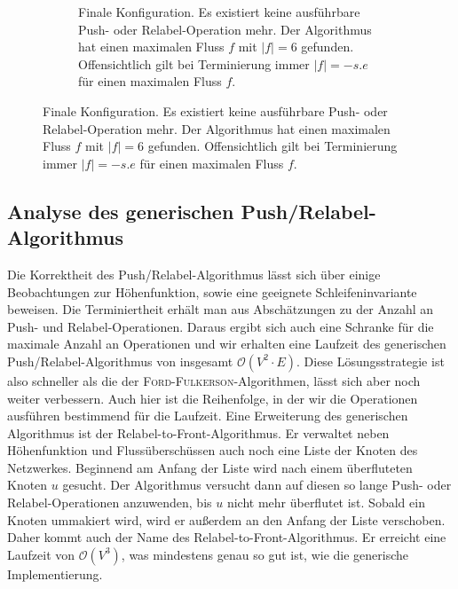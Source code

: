 \documentclass[12pt,a4paper,titlepage,onecolumn,ngerman,bibliography=totocnumbered]{scrartcl}
\theoremstyle{definition}
\theoremstyle{remark}
\newcommand{\ff}{\textsc{Ford-Fulkerson}}
\newcommand{\pr}{Push/Relabel}
\begin{document}
\begin{figure}[H]
\begin{subfigure}{0.95\textwidth}
        \caption{Finale Konfiguration. 
                Es existiert keine ausführbare Push- oder Relabel-Operation mehr. 
                Der Algorithmus hat einen maximalen Fluss $f$ mit $\lvert f\rvert = 6$ gefunden.
                Offensichtlich gilt bei Terminierung immer $\lvert f\rvert = - s.e$ für einen maximalen Fluss $f$.}
	\end{subfigure}
\end{figure}

\subsection{Analyse des generischen \pr -Algorithmus}
Die Korrektheit des \pr -Algorithmus lässt sich über einige Beobachtungen zur Höhenfunktion, sowie eine geeignete Schleifeninvariante beweisen.
Die Terminiertheit erhält man aus Abschätzungen zu der Anzahl an Push- und Relabel-Operationen.
Daraus ergibt sich auch eine Schranke für die maximale Anzahl an Operationen und wir erhalten eine Laufzeit des generischen \pr -Algorithmus von insgesamt $\mathcal{O}(V^2 \cdot E)$.
Diese Lösungsstrategie ist also schneller als die der \ff -Algorithmen, lässt sich aber noch weiter verbessern.
Auch hier ist die Reihenfolge, in der wir die Operationen ausführen bestimmend für die Laufzeit.
Eine Erweiterung des generischen Algorithmus ist der Relabel-to-Front-Algorithmus.
Er verwaltet neben Höhenfunktion und Flussüberschüssen auch noch eine Liste der Knoten des Netzwerkes.
Beginnend am Anfang der Liste wird nach einem überfluteten Knoten $u$ gesucht.
Der Algorithmus versucht dann auf diesen so lange Push- oder Relabel-Operationen anzuwenden, bis $u$ nicht mehr überflutet ist.
Sobald ein Knoten ummakiert wird, wird er außerdem an den Anfang der Liste verschoben.
Daher kommt auch der Name des Relabel-to-Front-Algorithmus.
Er erreicht eine Laufzeit von $\mathcal{O}(V^3)$, was mindestens genau so gut ist, wie die generische Implementierung.
\end{document}
